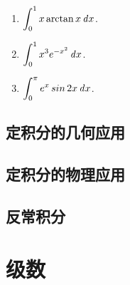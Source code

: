 \documentclass[a4paper,punct=CCT]{ctexbook}
\theoremstyle{definition}
\theoremstyle{remark}
\newif\ifshowsol
\newif\ifshowex
\begin{document}
\begin{enumerate}
\item \(\displaystyle \int_0^1 x \arctan x \mathop{}\!\mathit{d} x\).

  \ifshowsol
  \[
    \begin{split}
      \int_0^1 x \arctan x \dx
      &= \frac12 \int_0^1 \arctan x \diff(x^2)
      = \frac12 \paren[\Big]{x^2 \arctan x \Big\vert_0^1 - \int_0^1 \frac{x^2}{1+x^2} \dx} \\
      &= \frac\pi8 - \frac12 + \frac12 \arctan x \Big\vert_0^1
      = \frac\pi4 - \frac12.
    \end{split}
  \]
  \fi

\item \(\displaystyle \int_0^1 x^3 e^{-x^2} \mathop{}\!\mathit{d} x\).

  \ifshowsol
  \[
    \begin{split}
      \int_0^1 x^3 e^{-x^2} \dx
      &= - \frac12 \int_0^1 x^2 \diff e^{-x^2}
      = - \frac12 \paren[\Big]{x^2 e^{-x^2} \Big\vert_0^1 - \int_0^1 e^{-x^2} \cdot 2x \dx} \\
      &= - \frac12 \paren[\Big]{e^{-1} + e^{-x^2} \Big\vert_0^1}
      = \frac12 - \frac1e.
    \end{split}
  \]
  \fi

\item \(\displaystyle \int_0^\pi e^x \operatorname{\smash{sin}} 2x \mathop{}\!\mathit{d} x\).

  \ifshowsol
  因为
  \[
    \begin{split}
      \int_0^\pi e^x \sin 2x \dx
      &= e^x \sin 2x \Big\vert_0^\pi - 2 \int_0^\pi e^x \cos 2x \dx
      = -2 \paren[\Big]{e^x \cos 2x \Big\vert_0^\pi + 2 \int_0^\pi e^x \sin 2x \dx} \\
      &= -2(e^\pi - 1) - 4 \int_0^\pi e^x \sin 2x \dx.
    \end{split}
  \]
  所以
  \[
    \int_0^\pi e^x \sin 2x \dx = -\frac25 (e^\pi - 1).
  \]
  \fi
\end{enumerate}
\fi

\section{定积分的几何应用}

\ifshowex
\subpdfbookmark{练习}{B1.7.5.E}
\subsection*{练习}
\fi


\section{定积分的物理应用}

\section{反常积分}

\ifshowex
\subpdfbookmark{练习}{B1.7.7.E}
\subsection*{练习}
\fi

\chapter{级数}
\end{document}
